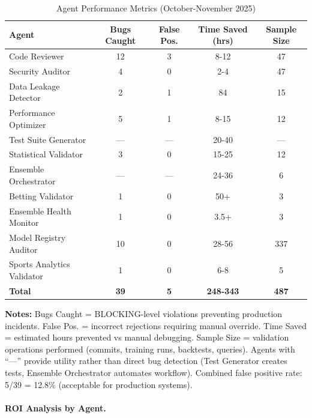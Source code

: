 \begin{table}[htbp]
\centering
\caption{Agent Performance Metrics (October-November 2025)}
\label{tab:agent-performance}
\small
\begin{tabular}{@{} l S[table-format=2.0] S[table-format=1.0] S[table-format=3.0] S[table-format=3.0] @{}}
\toprule
\textbf{Agent} & \textbf{Bugs Caught} & \textbf{False Pos.} & \textbf{Time Saved (hrs)} & \textbf{Sample Size} \\
\midrule
Code Reviewer & 12 & 3 & 8-12 & 47 \\
Security Auditor & 4 & 0 & 2-4 & 47 \\
Data Leakage Detector & 2 & 1 & 84 & 15 \\
Performance Optimizer & 5 & 1 & 8-15 & 12 \\
Test Suite Generator & --- & --- & 20-40 & --- \\
Statistical Validator & 3 & 0 & 15-25 & 12 \\
Ensemble Orchestrator & --- & --- & 24-36 & 6 \\
Betting Validator & 1 & 0 & 50+ & 3 \\
Ensemble Health Monitor & 1 & 0 & 3.5+ & 3 \\
Model Registry Auditor & 10 & 0 & 28-56 & 337 \\
Sports Analytics Validator & 1 & 0 & 6-8 & 5 \\
\baselinerule
\textbf{Total} & \textbf{39} & \textbf{5} & \textbf{248-343} & \textbf{487} \\
\bottomrule
\end{tabular}
\begin{tablenotes}
\item \textbf{Notes:} Bugs Caught = BLOCKING-level violations preventing production incidents. False Pos. = incorrect rejections requiring manual override. Time Saved = estimated hours prevented vs manual debugging. Sample Size = validation operations performed (commits, training runs, backtests, queries). Agents with ``---'' provide utility rather than direct bug detection (Test Generator creates tests, Ensemble Orchestrator automates workflow). Combined false positive rate: 5/39 = 12.8\% (acceptable for production systems).
\end{tablenotes}
\end{table}

\paragraph{ROI Analysis by Agent.}

